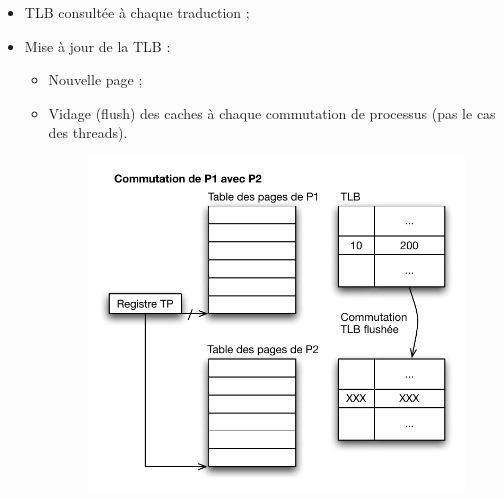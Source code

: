 \documentclass[11pt,english,french]{scrreprt}
\theoremstyle{remark}
\theoremstyle{definition}
\begin{document}
\begin{itemize}
	\item TLB consultée à chaque traduction ;
	\item Mise à jour de la TLB : \begin{itemize}
		\item Nouvelle page ;
		\item Vidage (flush) des caches à chaque commutation de processus (pas le cas des threads).
		\begin{figure}[h!]
			\center
			\vspace{-10pt}
			\includegraphics[scale=.85]{img/commutation-tlb}
		\end{figure}
	\end{itemize}
\end{itemize}
\end{document}
